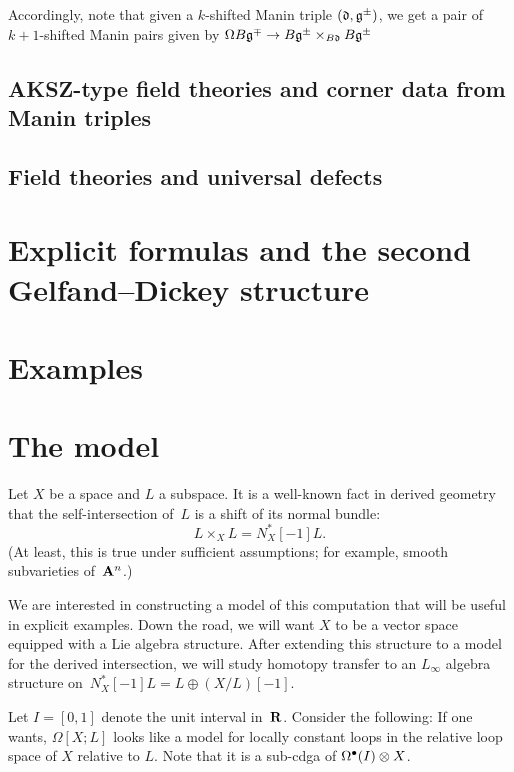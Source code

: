 \documentclass[12pt]{amsart}
\begin{document}
Accordingly, note that given a $k$-shifted Manin triple $(\mathfrak d , \mathfrak g^\pm)$, we get a pair of $k+1$-shifted Manin pairs given by $\Omega B\mathfrak g ^\mp \to B \mathfrak g^\pm \times _{B \mathfrak d} B \mathfrak g^\pm$

\subsection{AKSZ-type field theories and corner data from Manin triples}


\subsection{Field theories and universal defects}

\section{Explicit formulas and the second Gelfand--Dickey structure}

\section{Examples}

\section{The model}

Let $X$ be a space and $L$ a subspace. It is a well-known fact in derived geometry that the self-intersection of~$L$ is a shift of its normal bundle:
\[
L \times_X L = N^*_X[-1] L.
\]
(At least, this is true under sufficient assumptions; for example, smooth subvarieties of~${\mathbf{A}}^n$.)

We are interested in constructing a model of this computation that will be useful in explicit examples. Down the road, we will want $X$ to be a vector space equipped with a Lie algebra structure. After extending this structure to a model for the derived intersection,  we will study homotopy transfer to an $L_\infty$ algebra structure on~$N^*_X[-1] L = L \oplus (X/L)[-1]$.

Let $I = [0,1]$ denote the unit interval in~$\mathbf{R}$. Consider the following:
If one wants, $\Omega[X;L]$ looks like a model for locally constant loops in the relative loop space of $X$ relative to $L$. Note that it is a sub-cdga of $\Omega^\bullet(I) \otimes X$.
\end{document}
